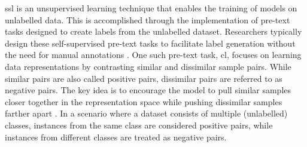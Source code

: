\acf{ssl} is an unsupervised learning technique that enables the training of models on unlabelled data.
This is accomplished through the implementation of pre-text tasks 
designed to create labels from the unlabelled dataset.
Researchers typically design these self-supervised pre-text tasks 
to facilitate label generation without the need for manual annotations \citep{PIC_2020}.
One such pre-text task, \acf{cl}, 
focuses on learning data representations by contrasting similar and dissimilar sample pairs. 
While similar pairs are also called positive pairs, 
dissimilar pairs are referred to as negative pairs.
The key idea is to encourage the model to pull similar samples closer together in the representation space 
while pushing dissimilar samples farther apart \citep{mining_potential_2024}.
In a scenario where a dataset consists of multiple (unlabelled) classes, 
instances from the same class are considered positive pairs, 
while instances from different classes are treated as negative pairs.